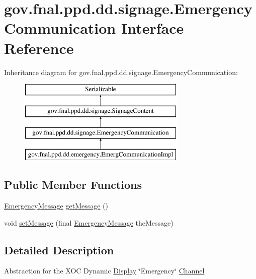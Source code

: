 \hypertarget{interfacegov_1_1fnal_1_1ppd_1_1dd_1_1signage_1_1EmergencyCommunication}{\section{gov.\-fnal.\-ppd.\-dd.\-signage.\-Emergency\-Communication Interface Reference}
\label{interfacegov_1_1fnal_1_1ppd_1_1dd_1_1signage_1_1EmergencyCommunication}
}
Inheritance diagram for gov.\-fnal.\-ppd.\-dd.\-signage.\-Emergency\-Communication\-:\begin{figure}[H]
\begin{center}
\leavevmode
\includegraphics[height=4.000000cm]{interfacegov_1_1fnal_1_1ppd_1_1dd_1_1signage_1_1EmergencyCommunication}
\end{center}
\end{figure}
\subsection*{Public Member Functions}
\begin{DoxyCompactItemize}
\item 
\hyperlink{classgov_1_1fnal_1_1ppd_1_1dd_1_1emergency_1_1EmergencyMessage}{Emergency\-Message} \hyperlink{interfacegov_1_1fnal_1_1ppd_1_1dd_1_1signage_1_1EmergencyCommunication_af923d219d82208a1ca4d947b8b726c56}{get\-Message} ()
\item 
void \hyperlink{interfacegov_1_1fnal_1_1ppd_1_1dd_1_1signage_1_1EmergencyCommunication_a11be4fd4ad5cada5a16903ba022d706b}{set\-Message} (final \hyperlink{classgov_1_1fnal_1_1ppd_1_1dd_1_1emergency_1_1EmergencyMessage}{Emergency\-Message} the\-Message)
\end{DoxyCompactItemize}


\subsection{Detailed Description}
Abstraction for the X\-O\-C Dynamic \hyperlink{interfacegov_1_1fnal_1_1ppd_1_1dd_1_1signage_1_1Display}{Display} \char`\"{}\-Emergency\char`\"{} \hyperlink{interfacegov_1_1fnal_1_1ppd_1_1dd_1_1signage_1_1Channel}{Channel}

